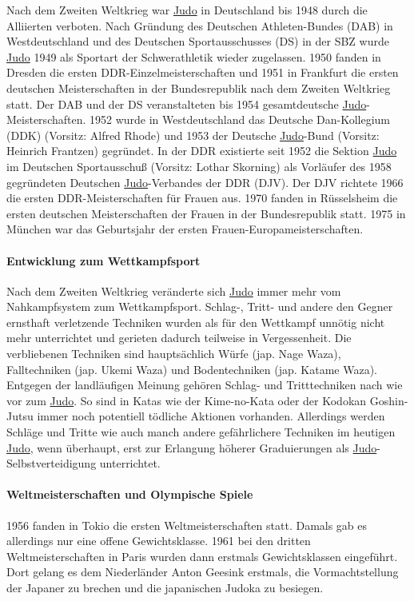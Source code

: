 \documentclass[justified, a4paper, notitlepage, captions=tableheading, nobib]{tufte-handout}
\begin{document}
Nach dem Zweiten Weltkrieg war \hyperref[org4f88021]{Judo} in Deutschland bis 1948 durch die Alliierten verboten. Nach Gründung des Deutschen Athleten-Bundes (DAB) in Westdeutschland und des Deutschen Sportausschusses (DS) in der SBZ wurde \hyperref[org4f88021]{Judo} 1949 als Sportart der Schwerathletik wieder zugelassen. 1950 fanden in Dresden die ersten DDR-Einzelmeisterschaften und 1951 in Frankfurt die ersten deutschen Meisterschaften in der Bundesrepublik nach dem Zweiten Weltkrieg statt. Der DAB und der DS veranstalteten bis 1954 gesamtdeutsche \hyperref[org4f88021]{Judo}-Meisterschaften. 1952 wurde in Westdeutschland das Deutsche Dan-Kollegium (DDK) (Vorsitz: Alfred Rhode) und 1953 der Deutsche \hyperref[org4f88021]{Judo}-Bund (Vorsitz: Heinrich Frantzen) gegründet. In der DDR existierte seit 1952 die Sektion \hyperref[org4f88021]{Judo} im Deutschen Sportausschuß (Vorsitz: Lothar Skorning) als Vorläufer des 1958 gegründeten Deutschen \hyperref[org4f88021]{Judo}-Verbandes der DDR (DJV). Der DJV richtete 1966 die ersten DDR-Meisterschaften für Frauen aus. 1970 fanden in Rüsselsheim die ersten deutschen Meisterschaften der Frauen in der Bundesrepublik statt. 1975 in München war das Geburtsjahr der ersten Frauen-Europameisterschaften.

\paragraph{Entwicklung zum Wettkampfsport}
\label{sec:org5d7345f}
Nach dem Zweiten Weltkrieg veränderte sich \hyperref[org4f88021]{Judo} immer mehr vom Nahkampfsystem zum Wettkampfsport. Schlag-, Tritt- und andere den Gegner ernsthaft verletzende Techniken wurden als für den Wettkampf unnötig nicht mehr unterrichtet und gerieten dadurch teilweise in Vergessenheit. Die verbliebenen Techniken sind hauptsächlich Würfe (jap. Nage Waza), Falltechniken (jap. Ukemi Waza) und Bodentechniken (jap. Katame Waza). Entgegen der landläufigen Meinung gehören Schlag- und Tritttechniken nach wie vor zum \hyperref[org4f88021]{Judo}. So sind in Katas wie der Kime-no-Kata oder der Kodokan Goshin-Jutsu immer noch potentiell tödliche Aktionen vorhanden. Allerdings werden Schläge und Tritte wie auch manch andere gefährlichere Techniken im heutigen \hyperref[org4f88021]{Judo}, wenn überhaupt, erst zur Erlangung höherer Graduierungen als \hyperref[org4f88021]{Judo}-Selbstverteidigung unterrichtet.

\paragraph{Weltmeisterschaften und Olympische Spiele}
\label{sec:org0d9e84e}
1956 fanden in Tokio die ersten Weltmeisterschaften statt. Damals gab es allerdings nur eine offene Gewichtsklasse. 1961 bei den dritten Weltmeisterschaften in Paris wurden dann erstmals Gewichtsklassen eingeführt. Dort gelang es dem Niederländer Anton Geesink erstmals, die Vormachtstellung der Japaner zu brechen und die japanischen Judoka zu besiegen.
\end{document}
